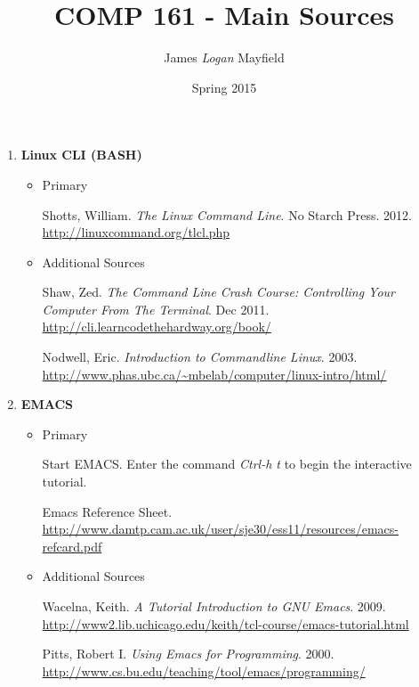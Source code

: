 \documentclass[10pt]{article}
\title{COMP 161 - Main Sources}
\author{ James \textit{Logan} Mayfield }
\date{Spring 2015}
\begin{document}
\maketitle

\begin{enumerate}
\item \textbf{Linux CLI (BASH)}
\begin{itemize}
\item Primary 

Shotts, William. \textit{The Linux Command Line}. No Starch Press. 2012. 
\newline \url{http://linuxcommand.org/tlcl.php}

\vspace{.25in}

\item Additional Sources

Shaw, Zed. \textit{The Command Line Crash Course: Controlling Your Computer From The Terminal}. Dec 2011. 
\newline \url{http://cli.learncodethehardway.org/book/}

\vspace{.25in}

Nodwell, Eric. \textit{Introduction to Commandline Linux}. 2003.
\newline \url{http://www.phas.ubc.ca/~mbelab/computer/linux-intro/html/}
\vspace{.25in}
\end{itemize}

\item \textbf{EMACS}
\begin{itemize}
\item Primary

Start EMACS. Enter the command \textit{Ctrl-h t} to begin the interactive tutorial.
\vspace{.25in}

Emacs Reference Sheet. \newline
\url{http://www.damtp.cam.ac.uk/user/sje30/ess11/resources/emacs-refcard.pdf}	
\vspace{.25in}

\item Additional Sources

Wacelna, Keith. \textit{A Tutorial Introduction to GNU Emacs}. 2009.
\newline \url{http://www2.lib.uchicago.edu/keith/tcl-course/emacs-tutorial.html}
\vspace{.25in}

Pitts, Robert I. \textit{Using Emacs for Programming}. 2000. 
\newline \url{http://www.cs.bu.edu/teaching/tool/emacs/programming/} 
\vspace{.25in}


\end{itemize}
\end{enumerate}
\end{document}

